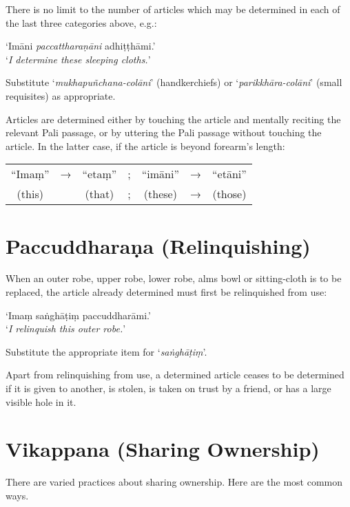 There is no limit to the number of articles which may be determined in each of
the last three categories above, e.g.:

‘Imāni \emph{paccattharaṇāni} adhiṭṭhāmi.’\\
‘\emph{I determine these sleeping cloths.}’

Substitute ‘\emph{mukhapuñchana-colāni}’ (handkerchiefs) or
‘\emph{parikkhāra-colāni}’ (small requisites) as appropriate.

Articles are determined either by touching the article and mentally reciting the
relevant Pali passage, or by uttering the Pali passage without touching the
article. In the latter case, if the article is beyond forearm's length:

\begin{tabular}{c c c c c c c}
“Imaṃ” & → & “etaṃ” & ; & “imāni” & → & “etāni”\\
(this) &   & (that) & ; & (these) & → & (those)\\
\end{tabular}

\section{Paccuddharaṇa (Relinquishing)}

When an outer robe, upper robe, lower robe, alms bowl or sitting-cloth is to be
replaced, the article already determined must first be relinquished from use:

‘Imaṃ saṅghāṭiṃ paccuddharāmi.’\\
‘\emph{I relinquish this outer robe.}’ 

Substitute the appropriate item for ‘\emph{saṅghāṭiṃ}’.

Apart from relinquishing from use, a determined article ceases to be determined
if it is given to another, is stolen, is taken on trust by a friend, or has a
large visible hole in it.

\section{Vikappana (Sharing Ownership)}

There are varied practices about sharing ownership. Here are the most common
ways.

